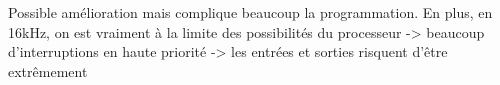\documentclass{article}
\begin{document}











    Possible amélioration mais complique beaucoup la programmation. En plus, en 16kHz, on est vraiment à la limite des possibilités du processeur -> beaucoup d'interruptions en haute priorité -> les entrées et sorties risquent d'être extrêmement
\end{document}
